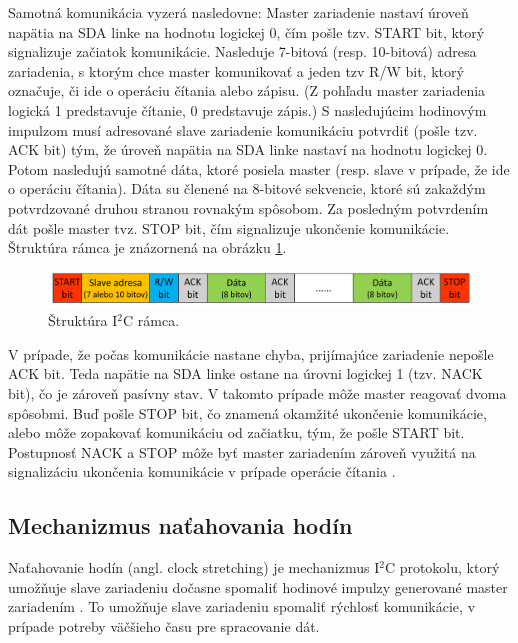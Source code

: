 Samotná komunikácia vyzerá nasledovne: Master zariadenie nastaví úroveň napätia na SDA linke na hodnotu logickej 0, čím pošle tzv. START bit, ktorý signalizuje začiatok komunikácie. Nasleduje 7-bitová (resp. 10-bitová) adresa zariadenia, s ktorým chce master komunikovať a jeden tzv R/W bit, ktorý označuje, či ide o operáciu čítania alebo zápisu. (Z pohľadu master zariadenia logická 1 predstavuje čítanie, 0 predstavuje zápis.) S nasledujúcim hodinovým impulzom musí adresované slave zariadenie komunikáciu potvrdiť (pošle tzv. ACK bit) tým, že úroveň napätia na SDA linke nastaví na hodnotu logickej 0. Potom nasledujú samotné dáta, ktoré posiela master (resp. slave v prípade, že ide o operáciu čítania). Dáta su členené na 8-bitové sekvencie, ktoré sú zakaždým potvrdzované druhou stranou rovnakým spôsobom. Za posledným potvrdením dát pošle master tvz. STOP bit, čím signalizuje ukončenie komunikácie. Štruktúra rámca je znázornená na obrázku \ref{obr:i2cFrame}.

\begin{figure}
    \centerline{\includegraphics[width=1\textwidth]{images/i2cFrame.png}}
    \caption[Štruktúra I$^2$C rámca]{Štruktúra I$^2$C rámca.}
    \label{obr:i2cFrame}
\end{figure}

V prípade, že počas komunikácie nastane chyba, prijímajúce zariadenie nepošle ACK bit. Teda napätie na SDA linke ostane na úrovni logickej 1 (tzv. NACK bit), čo je zároveň pasívny stav. V takomto prípade môže master reagovať dvoma spôsobmi. Buď pošle STOP bit, čo znamená okamžité ukončenie komunikácie, alebo môže zopakovať komunikáciu od začiatku, tým, že pošle START bit. Postupnosť NACK a STOP môže byť master zariadením zároveň využitá na signalizáciu ukončenia komunikácie v prípade operácie čítania \cite{i2cSpec}.

\subsection{Mechanizmus naťahovania hodín}
Naťahovanie hodín (angl. clock stretching) je mechanizmus I$^2$C protokolu, ktorý umožňuje slave zariadeniu dočasne spomaliť hodinové impulzy generované master zariadením \cite{i2cSpec}. To umožňuje slave zariadeniu spomaliť rýchlosť komunikácie, v prípade potreby väčšieho času pre spracovanie dát.

